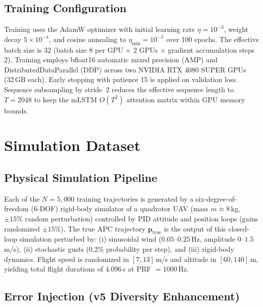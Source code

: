 \documentclass[conference]{IEEEtran}
\newcommand{\vp}{\mathbf{p}}
\begin{document}
\subsection{Training Configuration}
\label{sec:training}

Training uses the AdamW optimizer \cite{loshchilov2019adamw}
with initial learning rate $\eta{=}10^{-3}$, weight decay $5\times10^{-4}$,
and cosine annealing to $\eta_\text{min}{=}10^{-5}$ over 100 epochs.
The effective batch size is 32 (batch size $8$ per GPU
$\times$ 2 GPUs $\times$ gradient accumulation steps $2$).
Training employs bfloat16 automatic mixed precision (AMP) and
DistributedDataParallel (DDP) across two NVIDIA RTX 4080 SUPER GPUs (32\,GB each).
Early stopping with patience 15 is applied on validation loss.
Sequence subsampling by stride~2 reduces the effective sequence length to
$T{=}2048$ to keep the mLSTM $O(T^2)$ attention matrix within GPU memory bounds.

\section{Simulation Dataset}
\label{sec:dataset}

\subsection{Physical Simulation Pipeline}

Each of the $N{=}5{,}000$ training trajectories is generated by a
six-degree-of-freedom (6-DOF) rigid-body simulator of a quadrotor UAV
(mass $m \approx 8$\,kg, $\pm15\%$ random perturbation)
controlled by PID attitude and position loops
(gains randomized $\pm15\%$).
The true APC trajectory $\vp_\text{true}$ is the output of this
closed-loop simulation perturbed by:
(i) sinusoidal wind ($0.05$–$0.25$\,Hz, amplitude $0$–$1.5$\,m/s),
(ii) stochastic gusts (0.2\% probability per step), and
(iii) rigid-body dynamics.
Flight speed is randomized in $[7, 13]$\,m/s and altitude in $[60, 140]$\,m,
yielding total flight durations of $4.096$\,s at PRF $= 1000$\,Hz.

\subsection{Error Injection (v5 Diversity Enhancement)}
\end{document}
